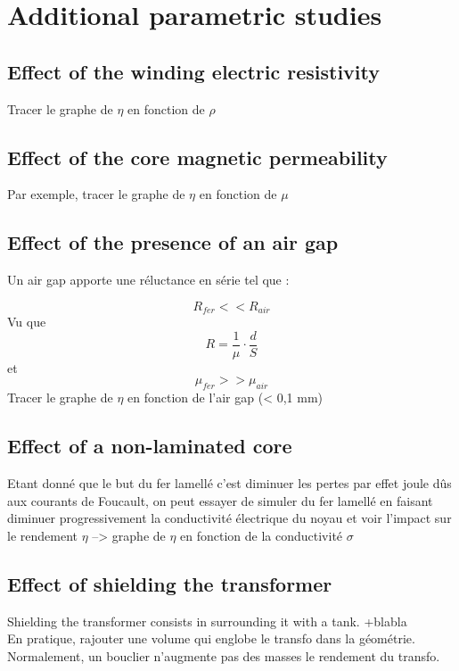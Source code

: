 \documentclass[12pt,a4paper]{report}
\begin{document}
\section{Additional parametric studies}

\subsection{Effect of the winding electric resistivity}
Tracer le graphe de $\eta$ en fonction de $\rho$
\subsection{Effect of the core magnetic permeability}
Par exemple, tracer le graphe de $\eta$ en fonction de $\mu$
\subsection{Effect of the presence of an air gap}
Un air gap apporte une réluctance en série tel que :

\begin{equation}
    R_{fer} << R_{air}
\end{equation}
Vu que 
\begin{equation}
   R = \frac{1}{\mu} \cdot \frac{d}{S}
\end{equation}
et
\begin{equation}
   \mu_{fer} >> \mu_{air}
\end{equation}
Tracer le graphe de $\eta$ en fonction de l'air gap (< 0,1 mm)

\subsection{Effect of a non-laminated core}
Etant donné que le but du fer lamellé c'est diminuer les pertes par effet joule dûs aux courants de Foucault, on peut essayer de simuler du fer lamellé en faisant diminuer progressivement la conductivité électrique du noyau et voir l'impact sur le rendement $\eta$
--> graphe de $\eta$ en fonction de la conductivité $\sigma$
\subsection{Effect of shielding the transformer}
Shielding the transformer consists in surrounding it with a tank. +blabla\\

En pratique, rajouter une volume qui englobe le transfo dans la géométrie. Normalement, un bouclier n'augmente pas des masses le rendement du transfo.
\end{document}
